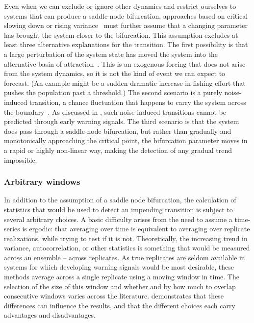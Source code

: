 \documentclass[authoryear,review,11pt]{elsarticle}
\begin{document}
Even when we can exclude or ignore other dynamics and
restrict ourselves to systems that can produce a saddle-node bifurcation,
approaches based on critical slowing down or rising variance~\citep[\emph{e.g.}][]{Held2004, Scheffer2009, Carpenter2011}
must further assume that a changing parameter has brought the system closer to the bifurcation.
This assumption excludes at least three alternative explanations for the transition.
The first possibility is that a large perturbation of the system state
has moved the system into the alternative basin of attraction~\citep{Scheffer2001, Scheffer2001}.
This is an exogenous forcing that does not arise from the system dynamics, so it is not the kind of event we can expect to forecast.
(An example might be a sudden dramatic increase in fishing effort that pushes the population past a threshold.)
The second scenario is a purely noise-induced transition, a chance fluctuation that happens to carry the system across the boundary~\citep{Ditlevsen2010}.
As discussed in \citet{Livina2012}, such noise induced transitions cannot be predicted through early warning signals.
The third scenario is that the system does pass through a saddle-node bifurcation,
but rather than gradually and monotonically approaching the critical point, the
bifurcation parameter moves in a rapid or highly non-linear way, making the detection of any gradual trend impossible.







\subsubsection*{Arbitrary windows}
In addition to the assumption of a saddle node bifurcation, 
the calculation of statistics that would be used to detect an impending transition is subject to several arbitrary choices.
A basic difficulty arises from the need to assume a time-series is ergodic: 
that averaging over time is equivalent to averaging over replicate realizations,
while trying to test if it is not.
Theoretically, the increasing trend in variance, autocorrelation, or other statistics
is something that would be measured across an ensemble -- across replicates. %
As true replicates are seldom available in systems for which developing warning signals would be most desirable,
these methods average across a single replicate using a moving window in time.
The selection of the size of this window and whether and by how much to overlap consecutive windows
varies across the literature.
\citet{Lenton2012} demonstrates that these differences can influence the results,
and that the different choices each carry advantages and disadvantages.
\end{document}
